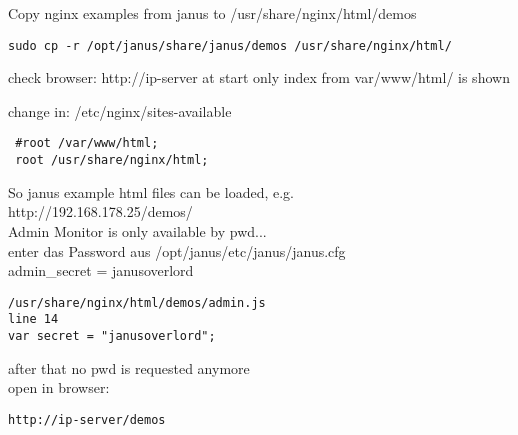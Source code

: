 Copy nginx examples from janus to /usr/share/nginx/html/demos
\begin{verbatim}
sudo cp -r /opt/janus/share/janus/demos /usr/share/nginx/html/
\end{verbatim}
check browser: http://ip-server
at start only index from var/www/html/ is shown

change in: /etc/nginx/sites-available
\begin{verbatim}
 #root /var/www/html;
 root /usr/share/nginx/html;
\end{verbatim}
So janus example html files can be loaded, e.g.\\
http://192.168.178.25/demos/\\

Admin Monitor is only available by pwd...\\
enter das Password aus /opt/janus/etc/janus/janus.cfg\\ 
admin\_secret = janusoverlord
\begin{verbatim}
/usr/share/nginx/html/demos/admin.js
line 14
var secret = "janusoverlord";
\end{verbatim}
after that no pwd is requested anymore\\
open in browser:
\begin{verbatim}
http://ip-server/demos
\end{verbatim}

